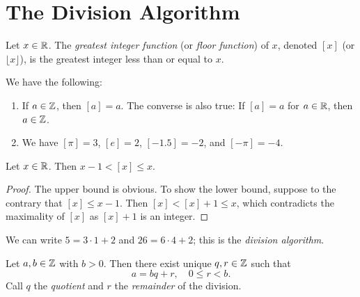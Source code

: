 \section{The Division Algorithm}

\begin{definition}
  Let $x \in \mathbb{R}$. The
  \emph{greatest integer function} (or
  \emph{floor function}) of
  $x$, denoted $[x]$ (or
  $\lfloor x \rfloor$),
  is the greatest integer less than or equal
  to $x$.
\end{definition}

\begin{example}
  We have the following:
  \begin{enumerate}
    \item If $a \in \mathbb{Z}$, then $[a] = a$.
      The converse is also true:
      If $[a] = a$ for $a \in \mathbb{R}$, then
      $a \in \mathbb{Z}$.
    \item We have
      $[\pi] = 3$, $[e] = 2$, $[-1.5] = -2$,
      and $[-\pi] = -4$.
  \end{enumerate}
\end{example}

\begin{lemma}\label{lem:floor-bound}
  Let $x \in \mathbb{R}$. Then $x - 1 < [x] \le x$.
\end{lemma}

\begin{proof}
  The upper bound is obvious. To show the
  lower bound, suppose to the contrary that
  $[x] \le x - 1$. Then $[x] < [x] + 1 \le x$,
  which contradicts the maximality of $[x]$
  as $[x] + 1$ is an integer.
\end{proof}

\begin{example}
  We can write $5 = 3 \cdot 1 + 2$ and
  $26 = 6 \cdot 4 + 2$; this is
  the \emph{division algorithm}.
\end{example}

\begin{theorem}
  Let $a, b \in \mathbb{Z}$ with $b > 0$. Then there
  exist unique $q, r \in \mathbb{Z}$ such
  that
  \[
    a = bq + r, \quad 0 \le r < b.
  \]
  Call $q$ the \emph{quotient} and
  $r$ the \emph{remainder} of the division.
\end{theorem}

